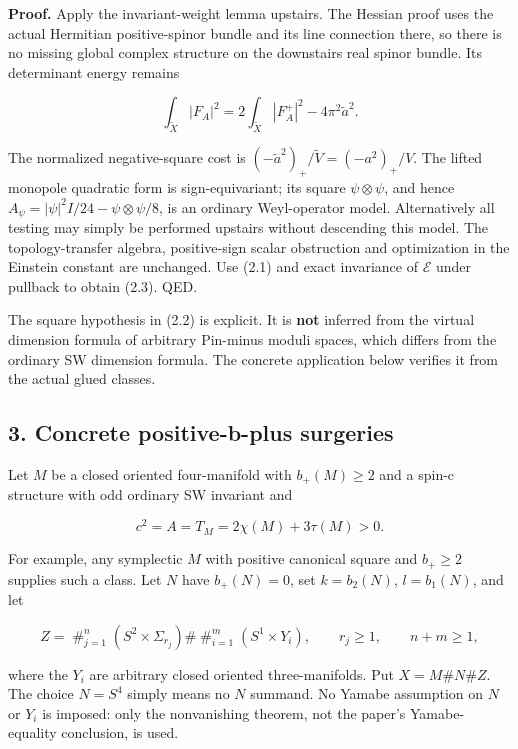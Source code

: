 \documentclass[
  10pt,
]{article}
\begin{document}
\textbf{Proof.} Apply the invariant-weight lemma upstairs. The Hessian
proof uses the actual Hermitian positive-spinor bundle and its line
connection there, so there is no missing global complex structure on the
downstairs real spinor bundle. Its determinant energy remains

\[
 \int_{\widetilde X}|F_A|^2
    =2\int_{\widetilde X}|F_A^+|^2-4\pi^2\widetilde a^2.
\]

The normalized negative-square cost is
\(( -\widetilde a^2)_+/\widetilde V=(-a^2)_+/V\). The lifted monopole
quadratic form is sign-equivariant; its square \(\psi\otimes\psi\), and
hence \(A_\psi=|\psi|^2I/24-\psi\otimes\psi/8\), is an ordinary
Weyl-operator model. Alternatively all testing may simply be performed
upstairs without descending this model. The topology-transfer algebra,
positive-sign scalar obstruction and optimization in the Einstein
constant are unchanged. Use (2.1) and exact invariance of \(\mathcal E\)
under pullback to obtain (2.3). QED.

The square hypothesis in (2.2) is explicit. It is \textbf{not} inferred
from the virtual dimension formula of arbitrary Pin-minus moduli spaces,
which differs from the ordinary SW dimension formula. The concrete
application below verifies it from the actual glued classes.

\hypertarget{concrete-positive-b-plus-surgeries}{%
\subsection{3. Concrete positive-b-plus
surgeries}\label{concrete-positive-b-plus-surgeries}}

Let \(M\) be a closed oriented four-manifold with \(b_+(M)\ge2\) and a
spin-c structure with odd ordinary SW invariant and

\[
                     c^2=A=T_M=2\chi(M)+3\tau(M)>0.
\]

For example, any symplectic \(M\) with positive canonical square and
\(b_+\ge2\) supplies such a class. Let \(N\) have \(b_+(N)=0\), set
\(k=b_2(N)\), \(l=b_1(N)\), and let

\[
 Z=\mathop{\#}_{j=1}^{n}(S^2\times\Sigma_{r_j})
      \#\mathop{\#}_{i=1}^{m}(S^1\times Y_i),
 \qquad r_j\ge1,\qquad n+m\ge1,                        \tag{3.1}
\]

where the \(Y_i\) are arbitrary closed oriented three-manifolds. Put
\(X=M\#N\#Z\). The choice \(N=S^4\) simply means no \(N\) summand. No
Yamabe assumption on \(N\) or \(Y_i\) is imposed: only the nonvanishing
theorem, not the paper's Yamabe-equality conclusion, is used.
\end{document}
